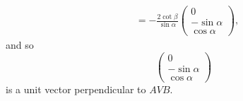 \begin{enumerate}
\begin{align*}
                                           & = -\frac{2\cot\beta}{\sin \alpha} \begin{pmatrix}
                                                                                   0            \\
                                                                                   -\sin \alpha \\
                                                                                   \cos \alpha
                                                                               \end{pmatrix},
          \end{align*}
          and so
          \[
              \begin{pmatrix}
                  0             \\
                  - \sin \alpha \\
                  \cos \alpha
              \end{pmatrix}
          \]
          is a unit vector perpendicular to \(AVB\).


\end{enumerate}
